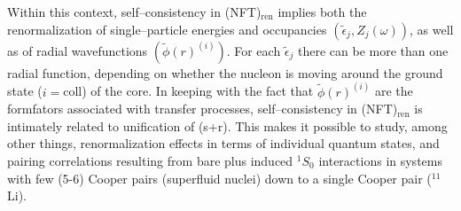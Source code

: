 Within this context, self--consistency in (NFT)$_{\text{ren}}$ implies both the renormalization of single--particle energies and occupancies $(\tilde\epsilon_j,Z_j(\omega))$, as well as of radial wavefunctions $(\tilde\phi(r)^{(i)})$. For each $\tilde\epsilon_j$ there can be more than one radial function, depending on whether the nucleon is moving around the ground state ($i=$coll) of the core. In keeping with the fact that $\tilde{\phi}(r)^{(i)}$ are the formfators associated with transfer processes, self--consistency in (NFT)$_{\text{ren}}$ is intimately related to unification of (s+r). This makes it possible to study, among other things, renormalization effects in terms of individual quantum states, and pairing correlations resulting from bare plus induced $^1S_0$ interactions in systems with few (5-6) Cooper pairs (superfluid nuclei) down to a single Cooper pair ($^{11}$Li).




















